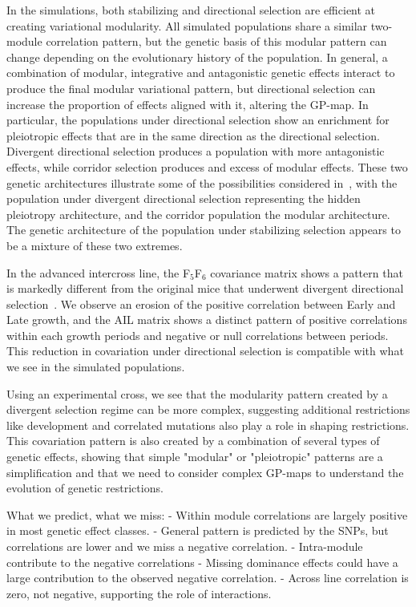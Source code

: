 \begin{refsection}
In the simulations, both stabilizing and directional selection are efficient
at creating variational modularity. All simulated populations share a similar
two-module correlation pattern, but the genetic basis of this modular pattern
can change depending on the evolutionary history of the population. In
general, a combination of modular, integrative and antagonistic genetic
effects interact to produce the final modular variational pattern, but
directional selection can increase the proportion of effects aligned with it,
altering the GP-map. In particular, the populations under directional
selection show an enrichment for pleiotropic effects that are in the same
direction as the directional selection. Divergent directional selection
produces a population with more antagonistic effects, while corridor selection
produces and excess of modular effects. These two genetic architectures
illustrate some of the possibilities considered in~\textcite{Pavlicev2011-xm},
with the population under divergent directional selection representing the
hidden pleiotropy architecture, and the corridor population the modular
architecture. The genetic architecture of the population under stabilizing
selection appears to be a mixture of these two extremes.

 In the advanced intercross line, the F$_{\text{5}}$F$_{\text{6}}$ covariance matrix shows a pattern that is markedly different from the original mice that underwent divergent directional selection~\parencite{Atchley1997-vn}. We observe an erosion of the positive correlation between Early and Late growth, and the AIL matrix shows a distinct pattern of positive correlations within each growth periods and negative or null correlations between periods. This reduction in covariation under directional selection is compatible with what we see in the simulated populations.

Using an experimental cross, we see that the modularity pattern created by a divergent selection regime can be more complex, suggesting additional restrictions like development and correlated mutations also play a role in shaping restrictions. This covariation pattern is also created by a combination of several types of genetic effects, showing that simple "modular" or "pleiotropic" patterns are a simplification and that we need to consider complex GP-maps to understand the evolution of genetic restrictions.

What we predict, what we miss:
- Within module correlations are largely positive in most genetic effect classes. 
- General pattern is predicted by the SNPs, but correlations are lower and we miss a negative correlation.
- Intra-module contribute to the negative correlations
- Missing dominance effects could have a large contribution to the observed negative correlation.
- Across line correlation is zero, not negative, supporting the role of interactions.


\end{refsection}
